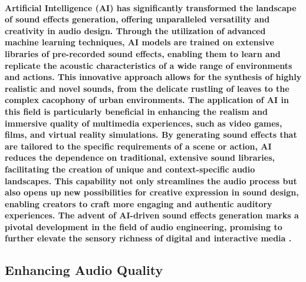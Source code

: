 \documentclass[11pt,a4paper,oneside]{report}
\begin{document}
\paragraph{Artificial Intelligence (AI) has significantly transformed the landscape of sound effects generation, offering unparalleled versatility and creativity in audio design. Through the utilization of advanced machine learning techniques, AI models are trained on extensive libraries of pre-recorded sound effects, enabling them to learn and replicate the acoustic characteristics of a wide range of environments and actions. This innovative approach allows for the synthesis of highly realistic and novel sounds, from the delicate rustling of leaves to the complex cacophony of urban environments. The application of AI in this field is particularly beneficial in enhancing the realism and immersive quality of multimedia experiences, such as video games, films, and virtual reality simulations. By generating sound effects that are tailored to the specific requirements of a scene or action, AI reduces the dependence on traditional, extensive sound libraries, facilitating the creation of unique and context-specific audio landscapes. This capability not only streamlines the audio process but also opens up new possibilities for creative expression in sound design, enabling creators to craft more engaging and authentic auditory experiences. The advent of AI-driven sound effects generation marks a pivotal development in the field of audio engineering, promising to further elevate the sensory richness of digital and interactive media \cite{greshler2021catch}.}
\subsection{Enhancing Audio Quality}
\end{document}
